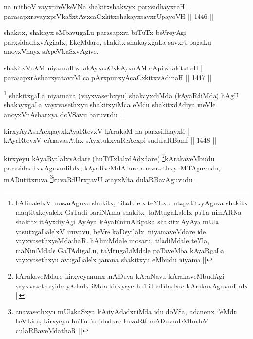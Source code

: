 \begin{shl}
na mithoV vayxtireVkeVNa shakitxshakwyx parxsidhayxtaH ||  \\
parasapxravayxpeVkaSxtAvxcaCxkitxshakayxsavxrUpayoVH ||  1446 ||  
\end{shl}

\begin{artha}
shakitx, shakayx eMbavugaLu parasapxra biTuTx beVreyAgi parxsidadhxvAgilalx, EkeMdare, shakitx shakayxgaLa savxrUpagaLu anoyxVnayx sApeVkaSxvAgive.
\end{artha}


\begin{shl}
shakitxVnAM niyamaH shakAyxcaCxkAyxnAM cApi shakitxtaH ||  \\
parasapxrAsharxyatavxM ca pArxpunxyAcaCxkitxvAdinaH ||  1447 ||  
\end{shl}

\begin{artha}
\footnote{hAlinalelxV mosarAguva shakitx, tiladalelx teYlavu utapxtitxyAguva shakitx maqtitxkeyalelx GaTadi pariNAma shakitx. taMtugaLalelx paTa nimARNa shakitx itAyxdiyAgi AyAya kAyaRnimARpaka shakitx AyAya mUla vasutxgaLalelxV iruvavu, beVre kaDeyilalx, niyamaveMdare ide. vayxvasethxyeMdathaR. hAliniMdale mosaru, tiladiMdale teYla, maNiniMdale GaTAdigaLu, taMtugaLiMdale paTaveMba kAyaRgaLa vayxvasethxyu avugaLalelx janana shakitxyu eMbudu niyama ||}
shakitxgaLa niyamana (vayxvasethxyu) shakayxdiMda (kAyaRdiMda) hAgU shakayxgaLa vayxvasethxyu shakitxyiMda eMdu shakitxdAdiya meVle anoyxVnAsharxya doVSavu baruvudu ||
\end{artha}


\begin{shl}
kirxyAyAshAcxpayxkAyaRtevxV kArakaM na parxsidhayxti || \\
kAyaRtevxV cAnavasAthx sAyxtukxvaRcAcxpi sudulaRBamf ||  1448 ||  
\end{shl}

\begin{artha}
kirxyeyu kAyaRvalalxvAdare (huTiTxlalxdAdxdare) \footnote{kArakaveMdare kirxyeyanunx mADuva kAraNavu kArakaveMbudAgi vayxvasethxyide yAdadxriMda kirxyeye huTiTxdidadxre kArakavAguvudilalx ||}kArakaveMbudu parxsidadhxvAguvudilalx, kAyaRveMdAdare anavasethxyuMTAguvudu, mADutitxruva \footnote{anavasethxyu mUlakaSxya kAriyAdadxriMda idu doVSa, adanenx `\stext'eMdu heVLide, kirxyeyu huTuTxdidadxre kuvaRtf mADuvudeMbudeV dulaRBaveMdathaR ||}kuvaRdUrxpavU atayxMta dulaRBavAguvudu ||
\end{artha}


